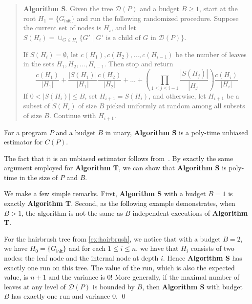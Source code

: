 \documentclass[acmsmall]{acmart}
\def\set#1{{\{ #1 \}}}
\newcommand{\init}{\mathsf{init}}
\begin{document}
\begin{verse}
    \textbf{Algorithm S}. Given the tree $\mathcal{D}(P)$ and a budget $B\geq 1$, start at the root $H_1 = \set{G_\init}$ and run the following
    randomized procedure. 
    Suppose the current set of nodes is $H_i$, and let $S(H_i) = \cup_{G\in H_i} \set{G' \mid G' \mbox{ is a child of }G \mbox{ in } \mathcal{D}(P)}$.
    
    \noindent If $S(H_i) = \emptyset$, let $c(H_1), c(H_2), \dots, c(H_{i-1})$ be the number of leaves in the sets $H_1,H_2,\dots,H_{i-1}$. Then stop and return 
    \[
    \frac{c(H_1)}{|H_1|} + \frac{|S(H_1)|}{|H_1|}\frac{c(H_2)}{|H_2|} + \ldots + \left( \prod_{1\leq j\leq i-1} \frac{|S(H_j)|}{|H_j|}\right)\frac{c(H_{i})}{|H_{i}|}
    \]
    If $0 < |S(H_i)| \leq B$, set $H_{i+1} = S(H_i)$, and otherwise, let $H_{i+1}$ be a subset of $S(H_i)$ of size $B$ picked uniformly at random among
    all subsets of size $B$.
    Continue with $H_{i+1}$.
\end{verse}

\begin{proposition}
    For a program $P$ and a budget $B$ in unary, \textbf{Algorithm S} is a poly-time unbiased estimator for $C(P)$.
\end{proposition}

The fact that it is an unbiased estimator follows from~\cite{rubinstein,vaisman2017}.
By exactly the same argument employed for \textbf{Algorithm T}, we can show that \textbf{Algorithm S} is poly-time in the size of $P$ and $B$.

We make a few simple remarks.
First, \textbf{Algorithm S} with a budget $B = 1$ is exactly \textbf{Algorithm T}.
Second, as the following example demonstrates, when $B > 1$, the algorithm is not the same as $B$ independent executions of \textbf{Algorithm T}.


\begin{tcolorbox}[
    colback=SkyBlue!5,
    colframe=blue!20,
    boxrule=1pt,
    arc=2pt,
    width=\textwidth,
    breakable
]
\begin{example}
For the hairbrush tree from \cref{ex:hairbrush}, we notice that with a budget $B = 2$,
we have $H_0 = \set{G_\init}$ and for each $1\leq i \leq n$, we have that $H_i$ consists of two nodes: the leaf node and the internal node at depth $i$.
Hence \textbf{Algorithm S} has exactly one run on this tree.
The value of the run, which is also the expected value, is $n+1$ and the variance is $0$!
More generally, if the maximal number of leaves at any level of $\mathcal{D}(P)$ is bounded by $B$, then \textbf{Algorithm S} with budget $B$
has exactly one run and variance 0.
\qed
\end{example}

\end{tcolorbox}
\end{document}
